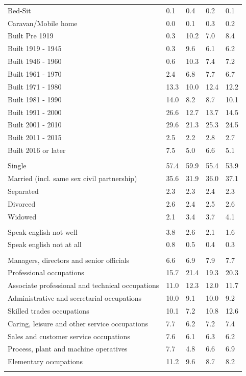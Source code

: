 \documentclass{article}
\begin{document}
\begin{table}[h]
\begin{tabular}{KTTTT}
Bed-Sit & 0.1& 0.4& 0.2& 0.1\\
Caravan/Mobile home & 0.0& 0.1& 0.3& 0.2\\
    \hline
Built Pre 1919 &  0.3& 10.2&  7.0&  8.4\\
Built 1919 - 1945 & 0.3& 9.6& 6.1& 6.2\\
Built  1946 - 1960 &  0.6& 10.3&  7.4&  7.2\\
Built  1961 - 1970 & 2.4& 6.8& 7.7& 6.7\\
Built  1971 - 1980 & 13.3& 10.0& 12.4& 12.2\\
Built  1981 - 1990 & 14.0&  8.2&  8.7& 10.1\\
Built  1991 - 2000 & 26.6& 12.7& 13.7& 14.5\\
Built  2001 - 2010 & 29.6& 21.3& 25.3& 24.5\\
Built  2011 - 2015 & 2.5& 2.2& 2.8& 2.7\\
Built  2016 or later & 7.5& 5.0& 6.6& 5.1\\
\hline
    \\
    \hline
Single & 57.4& 59.9& 55.4& 53.9\\
Married (incl. same sex civil partnership) & 35.6& 31.9& 36.0& 37.1\\
Separated  & 2.3& 2.3& 2.4& 2.3\\
Divorced  & 2.6& 2.4& 2.5& 2.6\\
Widowed & 2.1& 3.4& 3.7& 4.1\\
\hline
    \\ 
    \hline
Speak english not well & 3.8& 2.6& 2.1& 1.6\\
Speak english not at all & 0.8& 0.5& 0.4& 0.3\\
\hline
    \\
    \hline
Managers, directors and senior officials & 6.6& 6.9& 7.9& 7.7\\
Professional occupations & 15.7& 21.4& 19.3& 20.3\\
Associate professional and technical occupations & 11.0& 12.3& 12.0& 11.7\\
Administrative and secretarial occupations & 10.0&  9.1& 10.0&  9.2\\
Skilled trades occupations & 10.1&  7.2& 10.8& 12.6\\
Caring, leisure and other service occupations & 7.7& 6.2& 7.2& 7.4\\
Sales and customer service occupations & 7.6& 6.1& 6.3& 6.2\\
Process, plant and machine operatives & 7.7& 4.8& 6.6& 6.9\\
Elementary occupations & 11.2&  9.6&  8.7&  8.2\\
\hline
\end{tabular}
\end{table}
\end{document}
